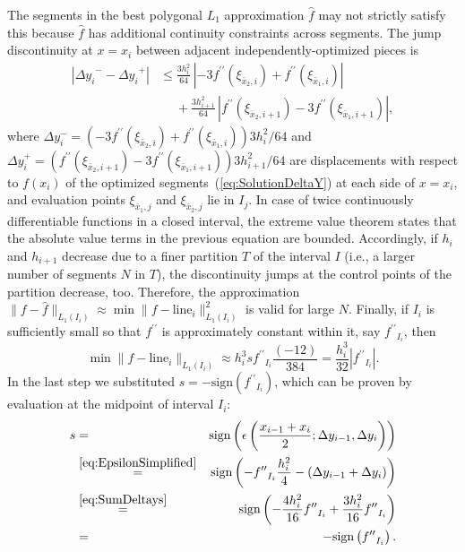 \documentclass[a4paper,english]{IEEEtran}
\begin{document}
The segments in the best polygonal ${L_{1}}$ approximation ${\hat{f}}$
may not strictly satisfy this because ${\hat{f}}$ has additional continuity
constraints across segments. The jump discontinuity at $x=x_{i}$
between adjacent independently-optimized pieces is
\begin{align*}
\left|{\Delta y_{i}}^{-}-{\Delta y_{i}}^{+}\right| & \leq\frac{3h_{i}^{2}}{64}\,\left|-3{{f}^{\prime\prime}}(\xi_{\bar{x}_{2},i})+{{f}^{\prime\prime}}(\xi_{\bar{x}_{1},i})\right|\\
 & \quad\;+\frac{3h_{i+1}^{2}}{64}\,\left|{{f}^{\prime\prime}}(\xi_{\bar{x}_{2},i+1})-3{{f}^{\prime\prime}}(\xi_{\bar{x}_{1},i+1})\right|,
\end{align*}
where $\Delta y_{i}^{-}=\left(-3{{f}^{\prime\prime}}(\xi_{\bar{x}_{2},i})+{{f}^{\prime\prime}}(\xi_{\bar{x}_{1},i})\right)3h_{i}^{2}/64$
and $\Delta y_{i}^{+}=\left({{f}^{\prime\prime}}(\xi_{\bar{x}_{2},i+1})-3{{f}^{\prime\prime}}(\xi_{\bar{x}_{1},i+1})\right)3h_{i+1}^{2}/64$
are displacements with respect to ${f}(x_{i})$ of the optimized segments~(\ref{eq:SolutionDeltaY})
at each side of $x=x_{i}$, and evaluation points $\xi_{\bar{x}_{1},j}$
and $\xi_{\bar{x}_{2},j}$ lie in $I_{j}$. In case of twice continuously
differentiable functions in a closed interval, the extreme value theorem
states that the absolute value terms in the previous equation are
bounded. Accordingly, if $h_{i}$ and $h_{i+1}$ decrease due to a
finer partition ${T}$ of the interval $I$ (i.e., a larger number
of segments $N$ in ${T}$), the discontinuity jumps at the control
points of the partition decrease, too. Therefore, the approximation
$\|{f}-{\hat{f}}\|_{{L_{1}}(I_{i})}\approx\min\|{f}-\mathrm{line}_{i}\|_{{L_{1}}(I_{i})}^{2}$
is valid for large $N$. Finally, if $I_{i}$ is sufficiently small
so that ${{f}^{\prime\prime}}$ is approximately constant within it, say ${{f}^{\prime\prime}}_{I_{i}}$,
then
\begin{equation}
\min\|{f}-\mathrm{line}_{i}\|_{{L_{1}}(I_{i})}\approx h_{i}^{3}s{{f}^{\prime\prime}}_{I_{i}}\frac{(-12)}{384}=\frac{h_{i}^{3}}{32}\left|{{f}^{\prime\prime}}_{I_{i}}\right|.\label{eq:approximate-best-L1-segment}
\end{equation}
In the last step we substituted $s=-{\text{sign}}({{f}^{\prime\prime}}_{I_{i}})$, which
can be proven by evaluation at the midpoint of interval $I_{i}$:
\begin{eqnarray*}
s & = & {\text{sign}}\left(\epsilon\left(\frac{x_{i-1}+x_{i}}{2};\Delta y_{i-1},\Delta y_{i}\right)\right)\\
 & \stackrel{\eqref{eq:EpsilonSimplified}}{=} & {\text{sign}}\left(-{{f}^{\prime\prime}}_{I_{i}}\frac{h_{i}^{2}}{4}-(\Delta y_{i-1}+\Delta y_{i})\right)\\
 & \stackrel{\eqref{eq:SumDeltays}}{=} & {\text{sign}}\left(-\frac{4h_{i}^{2}}{16}{{f}^{\prime\prime}}_{I_{i}}+\frac{3h_{i}^{2}}{16}{{f}^{\prime\prime}}_{I_{i}}\right)\\
 & = & -{\text{sign}}\left({{f}^{\prime\prime}}_{I_{i}}\right).
\end{eqnarray*}
\end{document}
